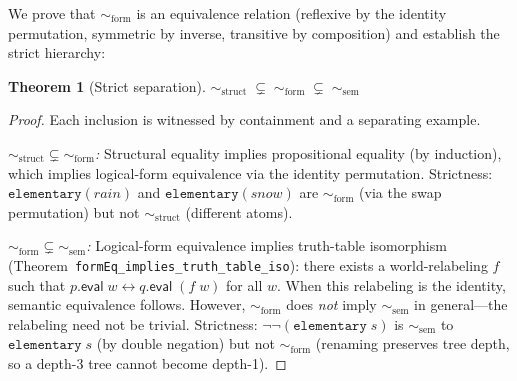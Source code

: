 \documentclass[10pt, letterpaper]{article}
\newtheorem{theorem}{Theorem}[section]
\theoremstyle{definition}
\theoremstyle{remark}
\newcommand{\eval}{\mathsf{eval}}
\newcommand{\structEq}{\sim_{\mathrm{struct}}}
\newcommand{\formEq}{\sim_{\mathrm{form}}}
\newcommand{\semEq}{\sim_{\mathrm{sem}}}
\begin{document}
\noindent
We prove that $\formEq$ is an equivalence relation (reflexive by
the identity permutation, symmetric by inverse, transitive by
composition) and establish the strict hierarchy:

\begin{theorem}[Strict separation]
\label{thm:hierarchy}
$\structEq \;\subsetneq\; \formEq \;\subsetneq\; \semEq$
\end{theorem}

\begin{proof}
Each inclusion is witnessed by containment and a separating example.

\emph{$\structEq \subsetneq \formEq$:}
Structural equality implies propositional equality (by induction),
which implies logical-form equivalence via the identity
permutation.  Strictness: $\mathtt{elementary}(\mathit{rain})$
and $\mathtt{elementary}(\mathit{snow})$ are $\formEq$ (via the
swap permutation) but not $\structEq$ (different atoms).

\emph{$\formEq \subsetneq \semEq$:}
Logical-form equivalence implies truth-table isomorphism
(Theorem~\texttt{formEq\_implies\_truth\_table\_iso}): there
exists a world-relabeling $f$ such that $p.\eval\;w
\leftrightarrow q.\eval\;(f\;w)$ for all $w$.
When this relabeling is the identity, semantic equivalence
follows.  However, $\formEq$ does \emph{not} imply $\semEq$ in
general---the relabeling need not be trivial.
Strictness: $\lnot\lnot(\mathtt{elementary}\;s)$
is $\semEq$ to $\mathtt{elementary}\;s$ (by double negation) but
not $\formEq$ (renaming preserves tree depth, so a depth-3 tree
cannot become depth-1).
\end{proof}
\end{document}
